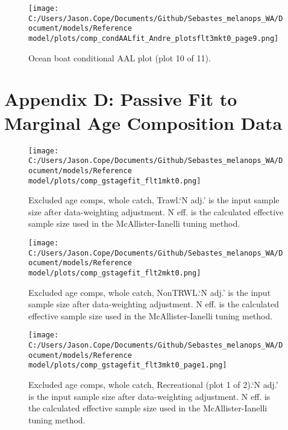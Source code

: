 \documentclass[11pt,
  english,
  letterpaper,
]{article}
\begin{document}
\begin{figure}
\centering
\texttt{[image: C:/Users/Jason.Cope/Documents/Github/Sebastes\_melanops\_WA/Document/models/Reference model/plots/comp\_condAALfit\_Andre\_plotsflt3mkt0\_page9.png]}
\caption{Ocean boat conditional AAL plot (plot 10 of 11).\label{fig:comp_condAALfit_Andre_plotsflt3mkt0_page9}}
\end{figure}

\clearpage

\hypertarget{app-d}{%
\section{Appendix D: Passive Fit to Marginal Age Composition Data}\label{app-d}}

\begin{figure}
\centering
\texttt{[image: C:/Users/Jason.Cope/Documents/Github/Sebastes\_melanops\_WA/Document/models/Reference model/plots/comp\_gstagefit\_flt1mkt0.png]}
\caption{Excluded age comps, whole catch, Trawl.`N adj.' is the input sample size after data-weighting adjustment. N eff. is the calculated effective sample size used in the McAllister-Ianelli tuning method.\label{fig:comp_gstagefit_flt1mkt0}}
\end{figure}

\begin{figure}
\centering
\texttt{[image: C:/Users/Jason.Cope/Documents/Github/Sebastes\_melanops\_WA/Document/models/Reference model/plots/comp\_gstagefit\_flt2mkt0.png]}
\caption{Excluded age comps, whole catch, NonTRWL.`N adj.' is the input sample size after data-weighting adjustment. N eff. is the calculated effective sample size used in the McAllister-Ianelli tuning method.\label{fig:comp_gstagefit_flt2mkt0}}
\end{figure}

\begin{figure}
\centering
\texttt{[image: C:/Users/Jason.Cope/Documents/Github/Sebastes\_melanops\_WA/Document/models/Reference model/plots/comp\_gstagefit\_flt3mkt0\_page1.png]}
\caption{Excluded age comps, whole catch, Recreational (plot 1 of 2).`N adj.' is the input sample size after data-weighting adjustment. N eff. is the calculated effective sample size used in the McAllister-Ianelli tuning method.\label{fig:comp_gstagefit_flt3mkt0_page1}}
\end{figure}
\end{document}
